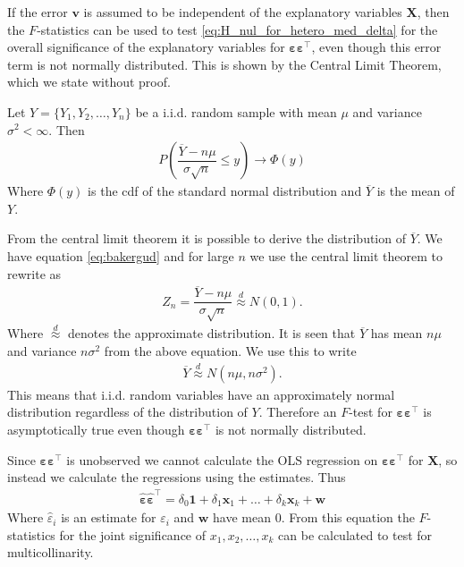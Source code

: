 If the error $\textbf{v}$ is assumed to be independent of the explanatory variables $\mathbf{X}$, then the $F$-statistics can be used to test \eqref{eq:H_nul_for_hetero_med_delta} for the overall significance of the explanatory variables for $\boldsymbol{\varepsilon \varepsilon^\top}$, even though this error term is not normally distributed. This is shown by the Central Limit Theorem, which we state without proof. 
\begin{theorem} \label{th:Central_limit_theorem}
Let $Y = \{ Y_1, Y_2, \ldots, Y_n \}$ be a i.i.d.$\!$ random sample with mean $\mu$ and variance $\sigma^2 < \infty$. Then
\begin{align} \label{eq:bakergud}
    P\left(\dfrac{\overline{Y} - n\mu}{\sigma \sqrt{n}}\leq y\right) \rightarrow \Phi(y)
\end{align}
Where $\Phi(y)$ is the cdf of the standard normal distribution and $\overline{Y}$ is the mean of $Y$. 
\end{theorem}
From the central limit theorem it is possible to derive the distribution of $\overline{Y}$. We have 
equation \eqref{eq:bakergud} and for large $n$ we use the central limit theorem to rewrite as
\begin{align*}
    Z_n = \dfrac{\overline{Y} - n\mu}{\sigma \sqrt{n}} \stackrel{d}{\approx} N(0,1). 
\end{align*}
Where $\stackrel{d}{\approx}$ denotes the approximate distribution. It is seen that $\overline{Y}$ has mean $n\mu$ and variance $n \sigma^2$ from the above equation. We use this to write
\begin{align*}
    \overline{Y} \stackrel{d}{\approx} N(n\mu, n\sigma^2). 
\end{align*}
This means that i.i.d. random variables have an approximately normal distribution regardless of the distribution of $Y$. Therefore an $F$-test for $\boldsymbol{\varepsilon \varepsilon^\top}$ is asymptotically true even though $\boldsymbol{\varepsilon \varepsilon^\top}$ is not normally distributed.  




Since $\boldsymbol{\varepsilon \varepsilon^\top}$ is unobserved we cannot calculate the OLS regression on $\boldsymbol{\varepsilon \varepsilon^\top}$ for $\mathbf{X}$, so instead we calculate the regressions using the estimates. Thus
\begin{align}\label{eq:OLS_residual_hat_epsioln_i_anden}
    \hat{\boldsymbol{\varepsilon}}\hat{\boldsymbol{\varepsilon}}^\top = \delta_0\textbf{1} + \delta_1\textbf{x}_1 + \ldots + \delta_k\textbf{x}_k + \mathbf{w}
\end{align}
Where $\hat{\varepsilon}_i$ is an estimate for $\varepsilon_i$ and $\textbf{w}$ have mean 0. From this equation the $F$-statistics for the joint significance of $x_1, x_2, \ldots, x_k$ can be calculated to test for multicollinarity. 

